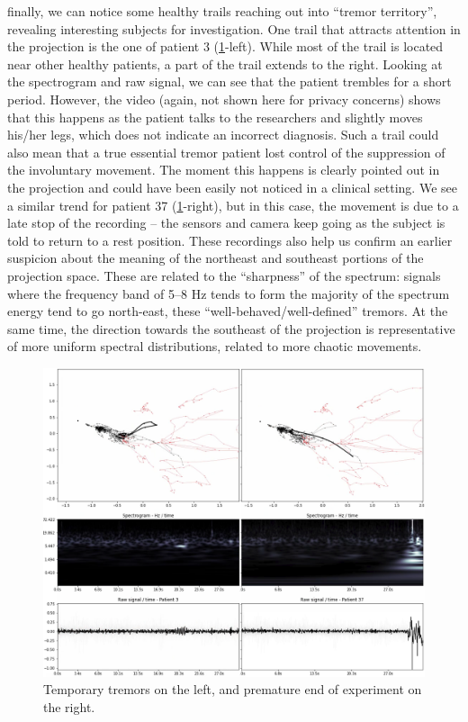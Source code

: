 finally, we can notice some healthy trails reaching out into ``tremor territory'', revealing interesting subjects for investigation. One trail that attracts attention in the projection is the one of patient 3 (\cref{fig:exp1-337}-left). While most of the trail is located near other healthy patients, a part of the trail extends to the right. Looking at the spectrogram and raw signal, we can see that the patient trembles for a short period. However, the video (again, not shown here for privacy concerns) shows that this happens as the patient talks to the researchers and slightly moves his/her legs, which does not indicate an incorrect diagnosis.
Such a trail could also mean that a true essential tremor patient lost control of the suppression of the involuntary movement. The moment this happens is clearly pointed out in the projection and could have been easily not noticed in a clinical setting. We see a similar trend for patient 37 (\cref{fig:exp1-337}-right), but in this case, the movement is due to a late stop of the recording -- the sensors and camera keep going as the subject is told to return to a rest position. These recordings also help us confirm an earlier suspicion about the meaning of the northeast and southeast portions of the projection space. These are related to the ``sharpness'' of the spectrum: signals where the frequency band of 5--8 Hz tends to form the majority of the spectrum energy tend to go north-east, these ``well-behaved/well-defined'' tremors. At the same time, the direction towards the southeast of the projection is representative of more uniform spectral distributions, related to more chaotic movements.

\begin{figure}[ht]
\centering
\includegraphics[width=\linewidth]{figures/nemo/exp1-337.png}
\caption{Temporary tremors on the left, and premature end of experiment on the right.}
\label{fig:exp1-337}
\end{figure}

